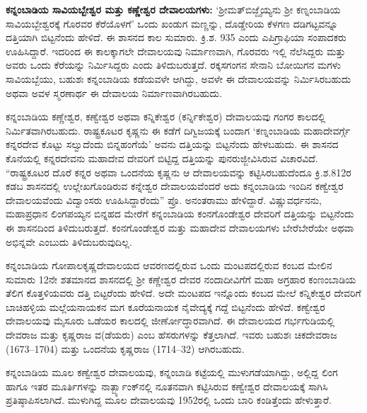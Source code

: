 \textbf{ಕನ್ನಂಬಾಡಿಯ ಸಾವಿಯಬ್ಬೇಶ್ವರ ಮತ್ತು ಕಣ್ಣೇಶ್ವರ ದೇವಾಲಯಗಳು:} ‘ಶ‍್ರೀಮತ್​ ಬಿಜ್ಜೈಯ್ಯನು ಶ‍್ರೀ ಕಣ್ನಂಬಾಡಿಯ ಸಾವಿಯಬ್ಬೇಶ್ವರಕ್ಕೆ ಗೊರವರ ಕೆರೆಯೊಳಗೆ’ ಒಂದು ಖಂಡುಗ ಮಣ್ಣನ್ನು, ದೊಡ್ಡೇರಿಯ ಕೆಳಗಣ ದಡಿಗಟ್ಟವನ್ನೂ ದತ್ತಿಯಾಗಿ ಬಿಟ್ಟನೆಂದು ಹೇಳಿದೆ. ಈ ಶಾಸನದ ಕಾಲ ಸುಮಾರು. ಕ್ರಿ.ಶ. 935 ಎಂದು ಎಪಿಗ್ರಾಫಿಯಾ ಸಂಪಾದಕರು ಊಹಿಸಿದ್ದಾರೆ. ಇದರಿಂದ ಈ ಕಾಲಕ್ಕಾಗಲೇ ದೇವಾಲಯವು ನಿರ್ಮಾಣವಾಗಿ, ಗೊರವರು ಇಲ್ಲಿ ನೆಲೆಸಿದ್ದರು ಮತ್ತು ಅವರು ಒಂದು ಕೆರೆಯನ್ನು ನಿರ್ಮಿಸಿದ್ದರು ಎಂದು ತಿಳಿದುಬರುತ್ತದೆ. ರಕ್ಕಸಗಂಗನ ಸೇನಾನಿ ಬೋಯಿಗನ ಮಗಳು ಸಾವಿಯಬ್ಬೆಯು, ಬಹುಶಃ ಕನ್ನಂಬಾಡಿಯ ಕಡೆಯವಳೇ ಆಗಿದ್ದು, ಅವಳೇ ಈ ದೇವಾಲಯವನ್ನು ನಿರ್ಮಿಸಿರಬಹುದು ಅಥವಾ ಅವಳ ಸ್ಮರಣಾರ್ಥ ಈ ದೇವಾಲಯ ನಿರ್ಮಾಣವಾಗಿರಬಹುದು. 

ಕನ್ನಂಬಾಡಿಯ ಕಣ್ಣೇಶ್ವರ, ಕಣ್ವೇಶ್ವರ ಅಥವಾ ಕನ್ನಿಕೇಶ್ವರ (ಕರ್ನ್ನಿಕೇಶ್ವರ) ದೇವಾಲಯವು ಗಂಗರ ಕಾಲದಲ್ಲಿ ನಿರ್ಮಿತವಾಗಿರಬಹುದು. ರಾಷ್ಟ್ರಕೂಟರ ಕೃಷ್ಣನು ಈ ಕಡೆಗೆ ದಿಗ್ವಿಜಯಕ್ಕೆ ಬಂದಾಗ ‘ಕಣ್ನಂಬಾಡಿಯ ಮಹಾದೇವರ್ಗ್ಗೆ ಕನ್ನರದೇವ ಕೊಟ್ಟು ಸಲ್ವುದೆಂದು ಬಿನ್ನಹಂಗೆಯೆ’ ಅವನು ದತ್ತಿಯನ್ನು ಬಿಟ್ಟನೆಂದು ಹೇಳಬಹುದು. ಈ ಶಾಸನದ ಕೊನೆಯಲ್ಲಿ ಕನ್ನರದೇವನು ಮಹಾದೇವ ದೇವರಿಗೆ ಬಿಟ್ಟಿದ್ದ ದತ್ತಿಯನ್ನು ಪುನರುಜ್ಜೀವಿಸಿರುವ ವಿಚಾರವಿದೆ. “ರಾಷ್ಟ್ರಕೂಟರ ದೊರೆ ಕನ್ನರ ಅಥವಾ ಒಂದನೆಯ ಕೃಷ್ಣನು ಆ ದೇವಾಲಯವನ್ನು ಕಟ್ಟಿಸಿರಬಹುದೆಂದೂ ಕ್ರಿ.ಶ.812ರ ಕಡಬ ಶಾಸನದಲ್ಲಿ ಉಲ್ಲೇಖಗೊಂಡಿರುವ ಕನ್ನೇಶ್ವರ ದೇವಾಲಯವೆಂದರೆ ಅದು ಕನ್ನಂಬಾಡಿಯ ಇಂದಿನ ಕಣ್ವೇಶ್ವರ ದೇವಾಲಯವೆಂದು ವಿದ್ವಾಂಸರು ಊಹಿಸಿದ್ದಾರೆಂದು” ಪ್ರೊ. ಅನಂತರಾಮು ಹೇಳಿದ್ದಾರೆ. ವಿಷ್ಣುವರ್ಧನನು, ಮಹಾಪ್ರಧಾನ ಲಿಂಗಪಯ್ಯನ ಬಿನ್ನಹದ ಮೇರೆಗೆ ಕನ್ನಂಬಾಡಿಯ ಕಂನಗೊಂಡೇಶ್ವರ ದೇವರಿಗೆ ದತ್ತಿಯನ್ನು ಬಿಟ್ಟನೆಂದು ಈ ಶಾಸನದಿಂದ ತಿಳಿದುಬರುತ್ತದೆ. ಕಂನಗೊಂಡೇಶ್ವರ ಮತ್ತು ಮಹಾದೇವ ದೇವಾಲಯಗಳು ಬೇರೆಬೇರೆಯೇ ಅಥವಾ ಅಭಿನ್ನವೇ ಎಂಬುದು ತಿಳಿದುಬರುವುದಿಲ್ಲ.

ಕನ್ನಂಬಾಡಿಯ ಗೋಪಾಲಕೃಷ್ಣದೇವಾಲಯದ ಆವರಣದಲ್ಲಿರುವ ಒಂದು ಮಂಟಪದಲ್ಲಿರುವ ಕಂಬದ ಮೇಲಿನ ಸುಮಾರು 12ನೇ ಶತಮಾನದ ಶಾಸನದಲ್ಲಿ ಶ‍್ರೀ ಕಣ್ಣೇಶ್ವರ ದೇವರ ನಂದಾದೀವಿಗೆಗೆ ಮಹಾ ಅಗ್ರಹಾರ ಕಂಣಂಬಾಡಿಯ ತೆಲಿಗ ಕೊತ್ತಳಿಯವರು ದತ್ತಿ ಬಿಟ್ಟರೆಂದು ಹೇಳಿದೆ. ಅದೇ ಮಂಟಪದ ಇನ್ನೊಂದು ಕಂಬದ ಮೇಲೆ ಕನ್ನಿಕೇಶ್ವರ ದೇವರಿಗೆ ಬಾಚಿಹಳ್ಳಿಯ ಮಲ್ಲೆಯನಾಯಕನ ಮಗ ಕೂರೆಯನಾಯಕ ನೈವೇದ್ಯಕ್ಕೆ ಗದ್ದೆ ಬಿಟ್ಟನೆಂದು ಹೇಳಿದೆ. ಕಣ್ವೇಶ್ವರ ದೇವಾಲಯವು ಮೈಸೂರು ಒಡೆಯರ ಕಾಲದಲ್ಲಿ ಜೀರ್ಣೋದ್ಧಾರವಾಗಿದೆ. ಈ ದೇವಾಲಯದ ಗರ್ಭಗುಡಿಯಲ್ಲಿ ದೇವರಾಜ ಮತ್ತು ಕೃಷ್ಣರಾಜ ವ(ಡೆಯರು) ಎಂಬ ಹೆಸರುಗಳನ್ನು ಕೆತ್ತಲಾಗಿದೆ. ಇವರು ಬಹುಶಃ ಚಿಕದೇವರಾಜ (1673–1704) ಮತ್ತು ಒಂದನೆಯ ಕೃಷ್ಣರಾಜ (1714–32) ಆಗಿರಬಹುದು.

ಕನ್ನಂಬಾಡಿಯ ಮೂಲ ಕಣ್ವೇಶ್ವರ ದೇವಾಲಯವು, ಕನ್ನಂಬಾಡಿ ಕಟ್ಟೆಯಲ್ಲಿ ಮುಳುಗಡೆಯಾಗಿದ್ದು, ಅಲ್ಲಿದ್ದ ಲಿಂಗ ಹಾಗೂ ಇತರ ಮೂರ್ತಿಗಳನ್ನು ನಾರ್ತ್ಬ್ಯಾಂಕ್​ನಲ್ಲಿ ನೂತನವಾಗಿ ಕಟ್ಟಿಸಿರುವ ಕಣ್ವೇಶ್ವರ ದೇವಾಲಯಕ್ಕೆ ಸಾಗಿಸಿ ಪ್ರತಿಷ್ಠಾಪಿಸಲಾಗಿದೆ. ಮುಳುಗಿದ್ದ ಮೂಲ ದೇವಾಲಯವು 1952ರಲ್ಲಿ ಒಂದು ಬಾರಿ ಕಂಡಿತ್ತೆಂದು ಹೇಳುತ್ತಾರೆ.

